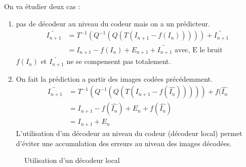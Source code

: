 \documentclass[main.tex]{subfiles}
\begin{document}
On va étudier deux cas :
\begin{enumerate}
\item pas de décodeur au niveau du codeur mais on a un prédicteur.
\begin{align*}
\tilde{I_{n+1}} &= T^{-1}(Q^{-1}(Q(T(I_{n+1} - f(I_n))))) + \tilde{I_{n+1}}\\
&= I_{n+1} - f(I_n) + E_{n+1} + \tilde{I_{n+1}} \text{	avec, E le bruit}
\end{align*}
$f(I_n)$ et $\tilde{I_{n+1}}$ ne se compensent pas totalement.
\bigbreak

\item On fait la prédiction a partir des images codées précédemment.
\begin{align*}
\tilde{I_{n+1}} &= T^{-1}(Q^{-1}(Q(T(I_{n+1} - f(\hat{I_n}))))) + f(\hat{I_n}\\
&= I_{n+1} - f(\hat{I_n}) + E_n +f(\hat{I_n})\\
&= I_{n+1} + E_n
\end{align*}
L'utilisation d'un décodeur au niveau du codeur (décodeur local) permet d'éviter une accumulation des erreurs au niveau des images décodées.
\end{enumerate}
\begin{figure}[H]
  \centering
  \caption{Utilisation d'un décodeur local}
\end{figure}
\end{document}
